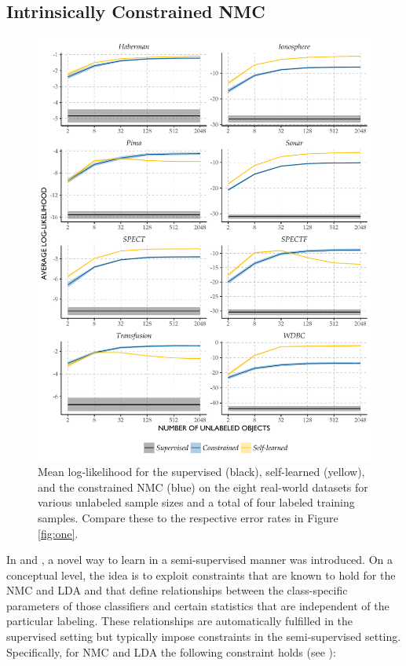 \documentclass[twoside]{memoir}\usepackage[]{graphicx}\usepackage{xcolor}
\makeatletter
\def\maxwidth{ %
  \ifdim\Gin@nat@width>\linewidth
    \linewidth
  \else
    \Gin@nat@width
  \fi
}
\newenvironment{knitrout}{}{} %
\renewcommand{\cite}{\citep}
\makeatother
\begin{document}
\subsection{Intrinsically Constrained NMC}
\begin{knitrout}
\color{fgcolor}\begin{figure}
\includegraphics[width=\maxwidth]{figure/two-1} \caption{Mean log-likelihood for the supervised (black), self-learned (yellow), and the constrained NMC (blue) on the eight real-world datasets for various unlabeled sample sizes and a total of four labeled training samples.  Compare these to the respective error rates in Figure \ref{fig:one}.}\label{fig:two}
\end{figure}


\end{knitrout}
In \cite{Loog2010} and \cite{Loog2012a}, a novel way to learn in a semi-supervised manner was introduced.  On a conceptual level, the idea is to exploit constraints that are known to hold for the NMC and LDA and that define relationships between the class-specific parameters of those classifiers and certain statistics that are independent of the particular labeling.  These relationships are automatically fulfilled in the supervised setting but typically impose constraints in the semi-supervised setting.  Specifically, for NMC and LDA the following constraint holds (see \citet{fukunaga90}):
\end{document}
